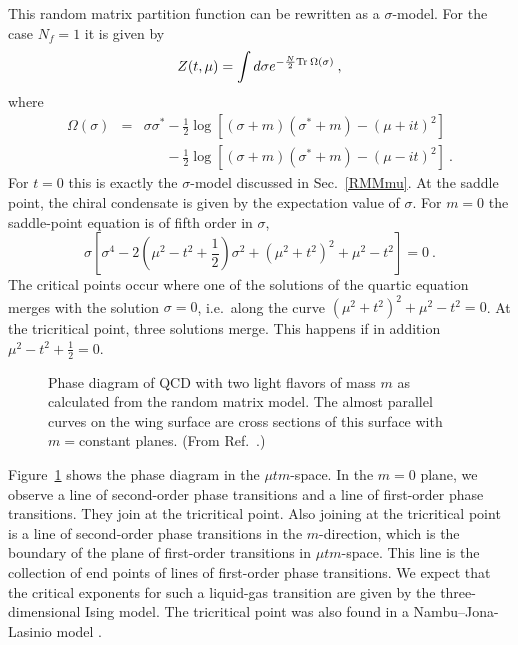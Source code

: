 This random matrix partition function can be rewritten as a
$\sigma$-model.  For the case $N_f = 1$ it is given by
\begin{equation}
  Z(t,\mu) = \int d\sigma e^{-\frac{N}{2}{\rm Tr\:}\Omega (\sigma)}\:,
\end{equation}
where
\begin{eqnarray}
  \Omega(\sigma) &\!\!\!=\!\!\!& \sigma \sigma^* 
  -\frac12\log [(\sigma+m)(\sigma^* + m) - (\mu+it)^2]\nonumber \\
  &&\phantom{\sigma \sigma^*}-\frac12\log [(\sigma+m)(\sigma^* + m) 
  - (\mu-it)^2]\:.
\end{eqnarray}
For $t = 0$ this is exactly the $\sigma$-model discussed in
Sec.~\ref{RMMmu}.  At the saddle point, the chiral condensate is given
by the expectation value of $\sigma$. For $m= 0$ the saddle-point
equation is of fifth order in $\sigma$,
\begin{equation}
  \sigma[\sigma^4 - 2(\mu^2 -t^2 +\frac 12)\sigma^2 
  + (\mu^2+t^2)^2 +\mu^2 -t^2] =0\:.
  \label{saddlemut}
\end{equation}
The critical points occur where one of the solutions of the quartic
equation merges with the solution $\sigma = 0$, i.e.\ along the curve
$(\mu^2+t^2)^2 +\mu^2 -t^2 =0$. At the tricritical point, three
solutions merge. This happens if in addition $\mu^2 -t^2 +\frac 12=0$.

\begin{figure}
  \begin{center}
    \caption{Phase diagram of QCD with two light flavors of mass $m$
      as calculated from the random matrix model.  The almost parallel
      curves on the wing surface are cross sections of this surface
      with $m=$constant planes.  (From Ref.~\cite{phase}.)}
      \label{fig:3dRM}
  \end{center}
\end{figure}  
Figure~\ref{fig:3dRM} shows the phase diagram in the $\mu t
m$-space. In the $m=0$ plane, we observe a line of second-order phase
transitions and a line of first-order phase transitions. They join at
the tricritical point.  Also joining at the tricritical point is a
line of second-order phase transitions in the $m$-direction, which is
the boundary of the plane of first-order transitions in $\mu
tm$-space. This line is the collection of end points of lines of
first-order phase transitions.  We expect that the critical exponents
for such a liquid-gas transition are given by the three-dimensional Ising
model.  The tricritical point was also found in a Nambu--Jona-Lasinio
model \cite{italians,krish3}.

